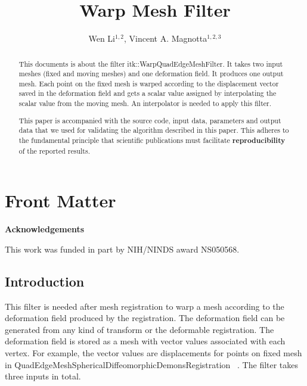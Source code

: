 \documentclass{InsightArticle}
\title{Warp Mesh Filter}
\author{Wen Li$^{1,2}$, Vincent A. Magnotta$^{1,2,3}$}
\makeatletter
\newcommand\ackname{Acknowledgements}
\newenvironment{acknowledgements}{%
      \titlepage
      \null\vfil
      \@beginparpenalty\@lowpenalty
      \begin{center}%
        \bfseries \ackname
        \@endparpenalty\@M
      \end{center}}%
     {\par\vfil\null\endtitlepage}
\newenvironment{acknowledgements}{%
      \if@twocolumn
        \section*{\abstractname}%
      \else
        \small
        \begin{center}%
          {\bfseries \ackname\vspace{-.5em}\vspace{\z@}}%
        \end{center}%
        \quotation
      \fi}
      {\if@twocolumn\else\endquotation\fi}
\newcommand{\IJhandlerIDnumber}{3117}
\makeatother
\begin{document}
%
% 
\IJhandlefooter{\IJhandlerIDnumber}


\ifpdf
\else
\fi


\maketitle


\ifhtml
\chapter*{Front Matter\label{front}}
\fi


\begin{abstract}
 
This documents is about the filter itk::WarpQuadEdgeMeshFilter.  It
takes two input meshes (fixed and moving meshes) and one deformation field. 
It produces one output mesh.
Each point on the fixed mesh is warped according to the displacement 
vector saved in the deformation field and gets a scalar value assigned 
by interpolating the scalar value from the moving mesh. An interpolator 
is needed 
to apply this filter.

This paper is accompanied with the source code, input data, parameters and
output data that we used for validating the algorithm described in this paper.
This adheres to the fundamental principle that scientific publications must
facilitate \textbf{reproducibility} of the reported results.
\end{abstract}

\begin{acknowledgements}
This work was funded in part by NIH/NINDS award NS050568.
\end{acknowledgements}

\tableofcontents

\section{Introduction}
This filter is needed after mesh registration to warp a mesh according to the
deformation field produced by the registration.  The deformation field can be generated 
from any kind of transform or the deformable registration. The deformation field
is stored as a mesh with vector values associated with each vertex. For example, 
the vector values are displacements for
 points on fixed mesh in QuadEdgeMeshSphericalDiffeomorphicDemonsRegistration
~\cite{MeshDemonsRegistrationIJ2009}. 
The filter takes three inputs in total. 
\end{document}
